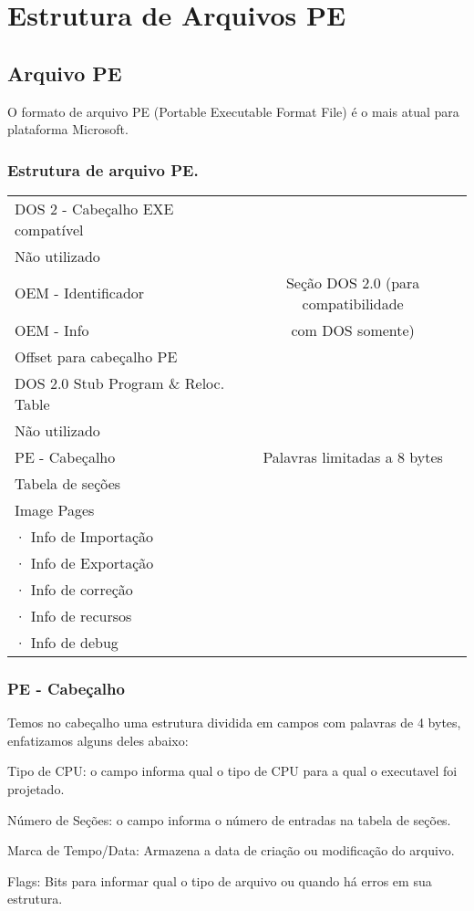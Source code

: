 
\chapter{Estrutura de Arquivos PE}
\label{ap:A}  
\section{Arquivo PE}

O formato de arquivo PE (Portable Executable Format File) é o mais atual para plataforma Microsoft.


\subsection{Estrutura de arquivo PE.}
\begin{list}{}
\item {\begin{tabular}{|l|c|}
\hline 
DOS 2 - Cabeçalho EXE compatível  & \tabularnewline
\cline{1-1} 
Não utilizado  & \tabularnewline
\cline{1-1} 
OEM - Identificador  & Seção DOS 2.0 (para compatibilidade \tabularnewline
OEM - Info  & com DOS somente)\tabularnewline
Offset para cabeçalho PE & \tabularnewline
\cline{1-1} 
DOS 2.0 Stub Program \& Reloc. Table  & \tabularnewline
\hline 
Não utilizado & \tabularnewline
\hline 
PE - Cabeçalho & Palavras limitadas a 8 bytes\tabularnewline
\hline 
Tabela de seções & \tabularnewline
\hline
Image Pages  & \tabularnewline
· Info de Importação & \tabularnewline
· Info de Exportação  & \tabularnewline
· Info de correção & \tabularnewline
· Info de recursos & \tabularnewline
· Info de debug & \tabularnewline
\hline
\end{tabular}}
\end{list}

\subsection{PE - Cabeçalho}


Temos no cabeçalho uma estrutura dividida em campos com palavras
de 4 bytes, enfatizamos alguns deles abaixo:


Tipo de CPU: o campo informa qual o tipo de CPU para a qual o executavel
foi projetado.


Número de Seções: o campo informa o número de entradas na tabela
de seções.


Marca de Tempo/Data: Armazena a data de criação ou modificação do
arquivo.


Flags: Bits para informar qual o tipo de arquivo ou quando há erros
em sua estrutura.


